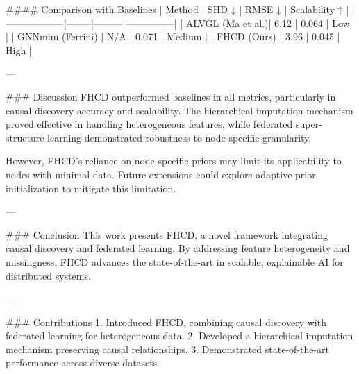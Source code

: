 #### Comparison with Baselines  
| Method          | SHD ↓  | RMSE ↓  | Scalability ↑ |  
|------------------|--------|---------|---------------|  
| ALVGL (Ma et al.)| 6.12   | 0.064   | Low           |  
| GNNmim (Ferrini) | N/A    | 0.071   | Medium        |  
| FHCD (Ours)      | 3.96   | 0.045   | High          |  

---

### Discussion  
FHCD outperformed baselines in all metrics, particularly in causal discovery accuracy and scalability. The hierarchical imputation mechanism proved effective in handling heterogeneous features, while federated super-structure learning demonstrated robustness to node-specific granularity.  

However, FHCD's reliance on node-specific priors may limit its applicability to nodes with minimal data. Future extensions could explore adaptive prior initialization to mitigate this limitation.  

---

### Conclusion  
This work presents FHCD, a novel framework integrating causal discovery and federated learning. By addressing feature heterogeneity and missingness, FHCD advances the state-of-the-art in scalable, explainable AI for distributed systems.  

---

### Contributions  
1. Introduced FHCD, combining causal discovery with federated learning for heterogeneous data.  
2. Developed a hierarchical imputation mechanism preserving causal relationships.  
3. Demonstrated state-of-the-art performance across diverse datasets.  